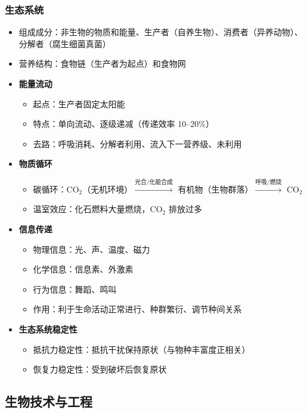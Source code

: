 \subsubsection{生态系统}

\begin{itemize}
  \item 组成成分：非生物的物质和能量、生产者（自养生物）、消费者（异养动物）、分解者（腐生细菌真菌）
  \item 营养结构：食物链（生产者为起点）和食物网
  \item \textbf{能量流动}
  \begin{itemize}
    \item 起点：生产者固定太阳能
    \item 特点：单向流动、逐级递减（传递效率 10--20\%）
    \item 去路：呼吸消耗、分解者利用、流入下一营养级、未利用
  \end{itemize}
  \item \textbf{物质循环}
  \begin{itemize}
    \item 碳循环：CO$_2$（无机环境）$\xrightarrow{\text{光合/化能合成}}$ 有机物（生物群落）$\xrightarrow{\text{呼吸/燃烧}}$ CO$_2$
    \item 温室效应：化石燃料大量燃烧，CO$_2$ 排放过多
  \end{itemize}
  \item \textbf{信息传递}
  \begin{itemize}
    \item 物理信息：光、声、温度、磁力
    \item 化学信息：信息素、外激素
    \item 行为信息：舞蹈、鸣叫
    \item 作用：利于生命活动正常进行、种群繁衍、调节种间关系
  \end{itemize}
  \item \textbf{生态系统稳定性}
  \begin{itemize}
    \item 抵抗力稳定性：抵抗干扰保持原状（与物种丰富度正相关）
    \item 恢复力稳定性：受到破坏后恢复原状
  \end{itemize}
\end{itemize}

\subsection{生物技术与工程}

